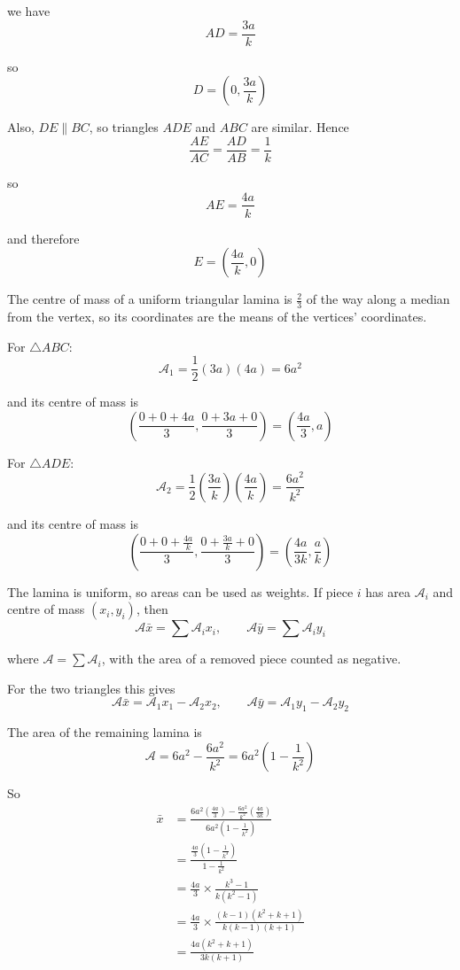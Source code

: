 \documentclass[leqno]{article}
\begin{document}
\begin{enumerate}[
  label=\textbf{\arabic*.},
  leftmargin=*,
  topsep=0pt,
  partopsep=0pt,
  parsep=0pt
]
\begin{djsSolution}
\begin{enumerate}[label=\textbf{(\alph*)}, start=1]
we have
\[
AD=\frac{3a}{k}
\]

so
\[
D=\left(0,\frac{3a}{k}\right)
\]

Also, \(DE\parallel BC\), so triangles \(ADE\) and \(ABC\) are similar. Hence
\[
\frac{AE}{AC}=\frac{AD}{AB}=\frac{1}{k}
\]

so
\[
AE=\frac{4a}{k}
\]

and therefore
\[
E=\left(\frac{4a}{k},0\right)
\]

The centre of mass of a uniform triangular lamina is \(\frac23\) of the way along a median from the vertex, so its coordinates are the means of the vertices' coordinates.

For \(\triangle ABC\):
\[
\mathcal{A}_1=\frac12(3a)(4a)=6a^2
\]

and its centre of mass is
\[
\left(\frac{0+0+4a}{3},\frac{0+3a+0}{3}\right)=\left(\frac{4a}{3},a\right)
\]

For \(\triangle ADE\):
\[
\mathcal{A}_2=\frac12\left(\frac{3a}{k}\right)\left(\frac{4a}{k}\right)=\frac{6a^2}{k^2}
\]

and its centre of mass is
\[
\left(\frac{0+0+\frac{4a}{k}}{3},\frac{0+\frac{3a}{k}+0}{3}\right)=\left(\frac{4a}{3k},\frac{a}{k}\right)
\]

The lamina is uniform, so areas can be used as weights. If piece \(i\) has area \(\mathcal{A}_i\) and centre of mass \((x_i,y_i)\), then
\[
\mathcal{A}\bar x=\sum\mathcal{A}_ix_i,\qquad\mathcal{A}\bar y=\sum\mathcal{A}_iy_i
\]

where \(\mathcal{A}=\sum\mathcal{A}_i\), with the area of a removed piece counted as negative.

For the two triangles this gives
\[
\mathcal{A}\bar x=\mathcal{A}_1x_1-\mathcal{A}_2x_2,
\qquad
\mathcal{A}\bar y=\mathcal{A}_1y_1-\mathcal{A}_2y_2
\]

The area of the remaining lamina is
\[
\mathcal{A}=6a^2-\frac{6a^2}{k^2}=6a^2\left(1-\frac{1}{k^2}\right)
\]

So
\begin{align*}
\bar x
&=\frac{6a^2\left(\frac{4a}{3}\right)-\frac{6a^2}{k^2}\left(\frac{4a}{3k}\right)}
{6a^2\left(1-\frac{1}{k^2}\right)} \\
&=\frac{\frac{4a}{3}\left(1-\frac{1}{k^3}\right)}{1-\frac{1}{k^2}} \\
&=\frac{4a}{3}\times\frac{k^3-1}{k(k^2-1)} \\
&=\frac{4a}{3}\times\frac{(k-1)(k^2+k+1)}{k(k-1)(k+1)} \\
&=\frac{4a(k^2+k+1)}{3k(k+1)}
\end{align*}


\end{enumerate}
\end{djsSolution}
\end{enumerate}
\end{document}
